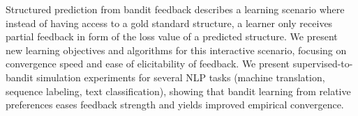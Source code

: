 Structured prediction from bandit feedback describes a learning scenario where instead of having access to a gold standard structure, a learner only receives partial feedback in form of the loss value of a predicted structure. We present new learning objectives and algorithms for this interactive scenario, focusing on convergence speed and ease of elicitability of feedback. We present supervised-to-bandit simulation experiments for several NLP tasks (machine translation, sequence labeling, text classification), showing that bandit learning from relative preferences eases feedback strength and yields improved empirical convergence.
